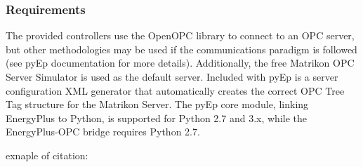 \subsubsection{Requirements}
The provided controllers use the OpenOPC library to connect to an OPC server, but other methodologies may be used if the communications paradigm is followed (see pyEp documentation for more details). Additionally, the free Matrikon OPC Server Simulator is used as the default server. Included with pyEp is a server configuration XML generator that automatically creates the correct OPC Tree Tag structure for the Matrikon Server. The pyEp core module, linking EnergyPlus to Python, is supported for Python 2.7 and 3.x, while the EnergyPlus-OPC bridge requires Python 2.7.




exnaple of citation: \cite{Camacho2013}